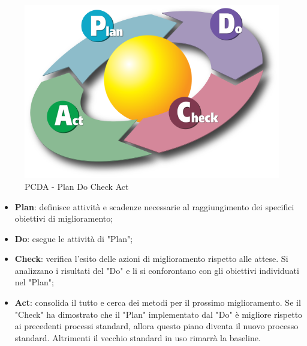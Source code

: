    \begin{figure}[h]
        \centering
        \includegraphics[scale=0.2]{sezioni/Immagini/PDCA.png}
        \caption{PCDA - Plan Do Check Act}
    \end{figure}

    \begin{itemize}
    \item \textbf{Plan}: definisce attività e scadenze necessarie al raggiungimento dei specifici obiettivi di miglioramento;
    \item \textbf{Do}: esegue le attività di "Plan";
    \item \textbf{Check}: verifica l'esito delle azioni di miglioramento rispetto alle attese. Si analizzano i risultati del "Do" e li si conforontano con gli obiettivi individuati nel "Plan";
    \item \textbf{Act}: consolida il tutto e cerca dei metodi per il prossimo miglioramento. Se il "Check" ha dimostrato che il "Plan" implementato dal "Do" è migliore rispetto ai precedenti processi standard, allora questo piano diventa il nuovo processo standard. Altrimenti il vecchio standard in uso rimarrà la baseline.
    \end{itemize}